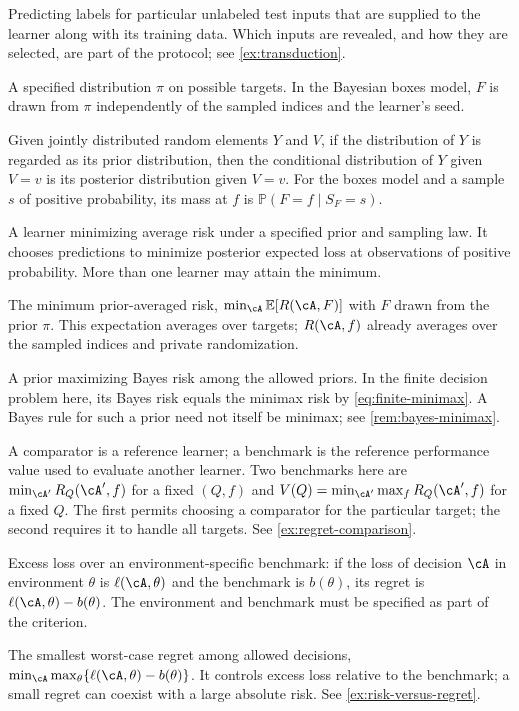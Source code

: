 \documentclass[11pt,twoside]{article}
\renewcommand{\P}{\mathbb P}
\theoremstyle{definition}
\theoremstyle{remark}
\begin{document}
\begin{description}[style=nextline,leftmargin=1.5em,labelindent=0pt]
Predicting labels for particular unlabeled test inputs that are supplied
to the learner along with its training data. Which inputs are revealed,
and how they are selected, are part of the protocol; see \cref{ex:transduction}.
\item[Prior]
A specified distribution $\pi$ on possible targets.
In the Bayesian boxes model, $F$ is drawn from $\pi$ independently of the
sampled indices and the learner's seed.
\item[Posterior]
Given jointly distributed random elements $Y$ and $V$, if the distribution
of $Y$ is regarded as its prior distribution, then the conditional
distribution of $Y$ given $V=v$ is its posterior distribution given $V=v$.
For the boxes model and a sample $s$ of positive probability, its mass at
$f$ is $\P(F=f\mid S_F=s)$.
\item[Bayes rule]
A learner minimizing average risk under a specified prior and sampling law.
It chooses predictions to minimize posterior expected loss at observations
of positive probability. More than one learner may attain the minimum.
\item[Bayes risk]
The minimum prior-averaged risk,
$\min_{\cA}\mathbb E[R(\cA,F)]$ with $F$ drawn from the prior $\pi$.
This expectation averages over targets; $R(\cA,f)$ already averages over
the sampled indices and private randomization.
\item[Least-favorable prior]
A prior maximizing Bayes risk among the allowed priors. In the finite
decision problem here, its Bayes risk equals the minimax risk by
\cref{eq:finite-minimax}. A Bayes rule for such a prior need not itself
be minimax; see \cref{rem:bayes-minimax}.
\item[Comparator; benchmark]
A comparator is a reference learner; a benchmark is the reference
performance value used to evaluate another learner. Two benchmarks here are
$\min_{\cA'}R_Q(\cA',f)$ for a fixed $(Q,f)$ and
$V(Q)=\min_{\cA'}\max_f R_Q(\cA',f)$ for a fixed $Q$.
The first permits choosing a comparator for the particular target; the
second requires it to handle all targets. See \cref{ex:regret-comparison}.
\item[Regret]
Excess loss over an environment-specific benchmark: if the loss of decision
$\cA$ in environment $\theta$ is $\ell(\cA,\theta)$ and the benchmark
is $b(\theta)$, its regret is $\ell(\cA,\theta)-b(\theta)$.
The environment and benchmark must be specified as part of the criterion.
\item[Minimax regret]
The smallest worst-case regret among allowed decisions,
$\min_{\cA}\max_\theta\{\ell(\cA,\theta)-b(\theta)\}$.
It controls excess loss relative to the benchmark; a small regret can
coexist with a large absolute risk. See \cref{ex:risk-versus-regret}.
\end{description}
\end{document}
